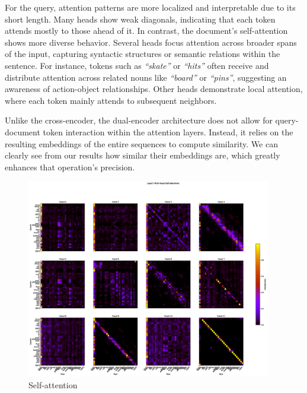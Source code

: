 \documentclass[runningheads]{llncs}
\begin{document}
For the query, attention patterns are more localized and interpretable due to its short length. Many heads show weak diagonals, indicating that each token attends mostly to those ahead of it.
In contrast, the document's self-attention shows more diverse behavior. Several heads focus attention across broader spans of the input, capturing syntactic structures or semantic relations within the sentence. For instance, tokens such as \textit{``skate''} or \textit{``hits''} often receive and distribute attention across related nouns like \textit{``board''} or \textit{``pins''}, suggesting an awareness of action-object relationships. Other heads demonstrate local attention, where each token mainly attends to subsequent neighbors.

Unlike the cross-encoder, the dual-encoder architecture does not allow for query-document token interaction within the attention layers. Instead, it relies on the resulting embeddings of the entire sequences to compute similarity. We can clearly see from our results how similar their embeddings are, which greatly enhances that operation's precision.

\vspace{2\baselineskip plus 0.5\baselineskip minus 0.5\baselineskip} %

\begin{figure}[!htb]
  \centering
  \includegraphics[width=0.95\textwidth, clip=true, trim = 70mm 25mm 130mm 45mm]{../figures/self_att_heads.eps}
  \caption{Self-attention}\label{self_att_heads}\label{img:self_attention}
\end{figure}
\end{document}
